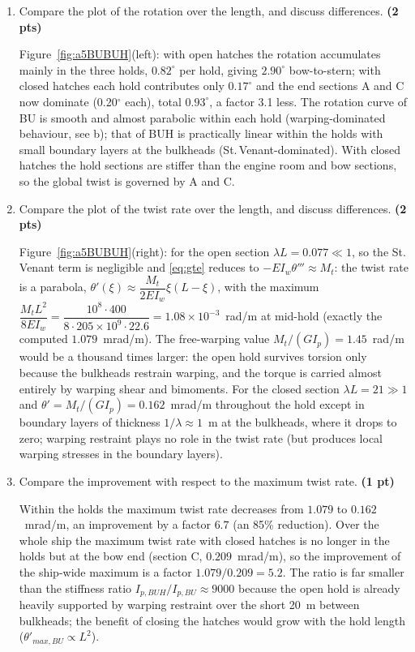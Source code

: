 \begin{enumerate}[label=\alph*.]
  \item Compare the plot of the rotation over the length, and discuss differences. \textbf{(2 pts)}

  Figure~\ref{fig:a5BUBUH}(left): with open hatches the rotation accumulates mainly in the three holds, $0.82^\circ$ per hold, giving $2.90^\circ$ bow-to-stern; with closed hatches each hold contributes only $0.17^\circ$ and the end sections A and C now dominate (0.20$^\circ$ each), total $0.93^\circ$, a factor 3.1 less. The rotation curve of BU is smooth and almost parabolic within each hold (warping-dominated behaviour, see b); that of BUH is practically linear within the holds with small boundary layers at the bulkheads (St.\,Venant-dominated). With closed hatches the hold sections are stiffer than the engine room and bow sections, so the global twist is governed by A and C.

  \item Compare the plot of the twist rate over the length, and discuss differences. \textbf{(2 pts)}

  Figure~\ref{fig:a5BUBUH}(right): for the open section $\lambda L=0.077\ll1$, so the St.\,Venant term is negligible and \eqref{eq:gte} reduces to $-EI_w\theta'''\approx M_t$: the twist rate is a parabola, $\theta'(\xi)\approx\dfrac{M_t}{2EI_w}\xi(L-\xi)$, with the maximum $\dfrac{M_tL^2}{8EI_w}=\dfrac{10^8\cdot400}{8\cdot205\times10^9\cdot22.6}=1.08\times10^{-3}$~rad/m at mid-hold (exactly the computed $1.079$~mrad/m). The free-warping value $M_t/(GI_p)=1.45$~rad/m would be a thousand times larger: the open hold survives torsion only because the bulkheads restrain warping, and the torque is carried almost entirely by warping shear and bimoments. For the closed section $\lambda L=21\gg1$ and $\theta'=M_t/(GI_p)=0.162$~mrad/m throughout the hold except in boundary layers of thickness $1/\lambda\approx1$~m at the bulkheads, where it drops to zero; warping restraint plays no role in the twist rate (but produces local warping stresses in the boundary layers).

  \item Compare the improvement with respect to the maximum twist rate. \textbf{(1 pt)}

  Within the holds the maximum twist rate decreases from $1.079$ to $0.162$~mrad/m, an improvement by a factor $\boxed{6.7}$ (an 85\% reduction). Over the whole ship the maximum twist rate with closed hatches is no longer in the holds but at the bow end (section C, $0.209$~mrad/m), so the improvement of the ship-wide maximum is a factor $1.079/0.209=5.2$. The ratio is far smaller than the stiffness ratio $I_{p,BUH}/I_{p,BU}\approx9000$ because the open hold is already heavily supported by warping restraint over the short 20~m between bulkheads; the benefit of closing the hatches would grow with the hold length ($\theta'_{max,BU}\propto L^2$).
\end{enumerate}
